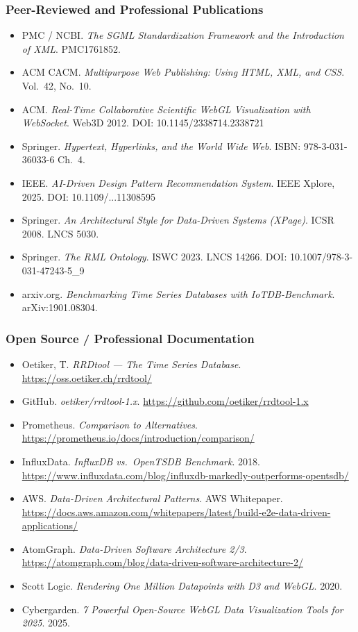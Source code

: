 \documentclass[11pt,letterpaper]{article}
\begin{document}
\subsubsection{Peer-Reviewed and Professional Publications}
\begin{itemize}[noitemsep]
  \item PMC / NCBI. \textit{The SGML Standardization Framework and the Introduction of XML}. PMC1761852.
  \item ACM CACM. \textit{Multipurpose Web Publishing: Using HTML, XML, and CSS}. Vol.\ 42, No.\ 10.
  \item ACM. \textit{Real-Time Collaborative Scientific WebGL Visualization with WebSocket}. Web3D 2012. DOI: 10.1145/2338714.2338721
  \item Springer. \textit{Hypertext, Hyperlinks, and the World Wide Web}. ISBN: 978-3-031-36033-6 Ch.\ 4.
  \item IEEE. \textit{AI-Driven Design Pattern Recommendation System}. IEEE Xplore, 2025. DOI: 10.1109/...11308595
  \item Springer. \textit{An Architectural Style for Data-Driven Systems (XPage)}. ICSR 2008. LNCS 5030.
  \item Springer. \textit{The RML Ontology}. ISWC 2023. LNCS 14266. DOI: 10.1007/978-3-031-47243-5\_9
  \item arxiv.org. \textit{Benchmarking Time Series Databases with IoTDB-Benchmark}. arXiv:1901.08304.
\end{itemize}

\subsubsection{Open Source / Professional Documentation}
\begin{itemize}[noitemsep]
  \item Oetiker, T. \textit{RRDtool --- The Time Series Database}. \url{https://oss.oetiker.ch/rrdtool/}
  \item GitHub. \textit{oetiker/rrdtool-1.x}. \url{https://github.com/oetiker/rrdtool-1.x}
  \item Prometheus. \textit{Comparison to Alternatives}. \url{https://prometheus.io/docs/introduction/comparison/}
  \item InfluxData. \textit{InfluxDB vs.\ OpenTSDB Benchmark}. 2018. \url{https://www.influxdata.com/blog/influxdb-markedly-outperforms-opentsdb/}
  \item AWS. \textit{Data-Driven Architectural Patterns}. AWS Whitepaper. \url{https://docs.aws.amazon.com/whitepapers/latest/build-e2e-data-driven-applications/}
  \item AtomGraph. \textit{Data-Driven Software Architecture 2/3}. \url{https://atomgraph.com/blog/data-driven-software-architecture-2/}
  \item Scott Logic. \textit{Rendering One Million Datapoints with D3 and WebGL}. 2020.
  \item Cybergarden. \textit{7 Powerful Open-Source WebGL Data Visualization Tools for 2025}. 2025.
\end{itemize}
\end{document}
